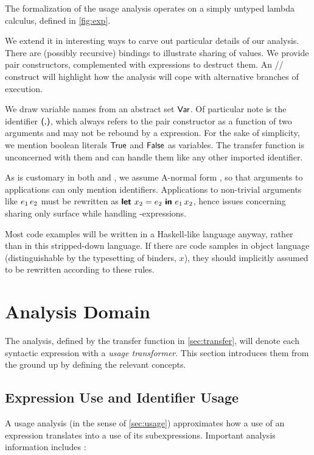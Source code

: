 The formalization of the usage analysis operates on a simply untyped lambda calculus, defined in \cref{fig:exp}. 

We extend it in interesting ways to carve out particular details of our analysis.
There are (possibly recursive)  bindings to illustrate sharing of values.
We provide pair constructors, complemented with  expressions to destruct them.
An // construct will highlight how the analysis will cope with alternative branches of execution.

We draw variable names from an abstract set $\text{\textsf{Var}}$. 
Of particular note is the identifier $\text{\textsf{(,)}}$, which always refers to the pair constructor as a function of two arguments and may not be rebound by a  expression. 
For the sake of simplicity, we mention boolean literals $\text{\textsf{True}}$ and $\text{\textsf{False}}$ as variables.
The transfer function is unconcerned with them and can handle them like any other imported identifier.

As is customary in both \textcite{card} and \textcite{callarity}, we assume A-normal form \parencite{anf}, so that arguments to applications can only mention identifiers. 
Applications to non-trivial arguments like $e_1\,e_2$ must be rewritten as $\text{\textsf{\textbf{let}}}~x_2 = e_2~\text{\textsf{\textbf{in}}}~e_1\,x_2$, hence issues concerning sharing only surface while handling -expressions.

Most code examples will be written in a Haskell-like language anyway, rather than in this stripped-down language.
If there are code samples in object language (distinguishable by the typesetting of binders, \eg {} \vs $x$), they should implicitly assumed to be rewritten according to these rules.

\section{Analysis Domain}\label{sec:dom}

The analysis, defined by the transfer function in \cref{sec:transfer}, will denote each syntactic expression with a \emph{usage transformer}. 
This section introduces them from the ground up by defining the relevant concepts.

\subsection{Expression Use and Identifier Usage}

A usage analysis (in the sense of \cref{sec:usage}) approximates how a use of an expression translates into a use of its subexpressions. 
Important analysis information includes \parencite{card}:

